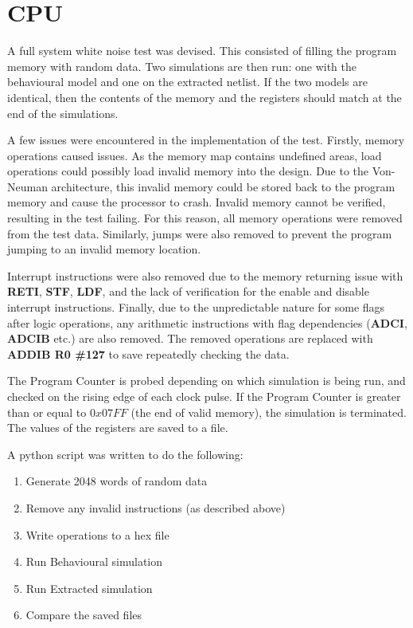 
\section{CPU}


A full system white noise test was devised. 
This consisted of filling the program memory with random data. 
Two simulations are then run: one with the behavioural model and one on the extracted netlist. 
If the two models are identical, then the contents of the memory and the registers should match at the end of the simulations.

A few issues were encountered in the implementation of the test.
Firstly, memory operations caused issues. 
As the memory map contains undefined areas, load operations could possibly load invalid memory into the design.
Due to the Von-Neuman architecture, this invalid memory could be stored back to the program memory and cause the processor to crash. 
Invalid memory cannot be verified, resulting in the test failing. 
For this reason, all memory operations were removed from the test data.
Similarly, jumps were also removed to prevent the program jumping to an invalid memory location. 

Interrupt instructions were also removed due to the memory returning issue with \textbf{RETI}, \textbf{STF}, \textbf{LDF}, and the lack of verification for the enable and disable interrupt instructions. 
Finally, due to the unpredictable nature for some flags after logic operations, any arithmetic instructions with flag dependencies (\textbf{ADCI}, \textbf{ADCIB} etc.) are also removed. 
The removed operations are replaced with \textbf{ADDIB R0 \#127} to save repeatedly checking the data. 

The Program Counter is probed depending on which simulation is being run, and checked on the rising edge of each clock pulse. %
If the Program Counter is greater than or equal to $0x07FF$ (the end of valid memory), the simulation is terminated.
The values of the registers are saved to a file. 

\noindent A python script was written to do the following:
\begin{enumerate}
\item Generate 2048 words of random data
\item Remove any invalid instructions (as described above)
\item Write operations to a hex file
\item Run Behavioural simulation
\item Run Extracted simulation
\item Compare the saved files
\end{enumerate}

